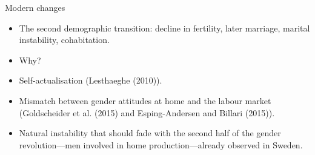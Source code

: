 \documentclass[11pt,notes=hide,aspectratio=169,mathserif]{beamer}
\begin{document}
\begin{frame}{Modern changes}
\begin{itemize}
  \item The second demographic transition: \pause decline in fertility, later marriage, marital instability, cohabitation.
  \item Why? 
  \pause \item Self-actualisation (Lesthaeghe (2010)).
  \item Mismatch between gender attitudes at home and the labour market (Goldscheider et al. (2015) and Esping-Andersen and Billari (2015)).
  \item Natural instability that should fade with the second half of the gender revolution—men involved in home production—already observed in Sweden.
\end{itemize}
\end{frame}
\end{document}
